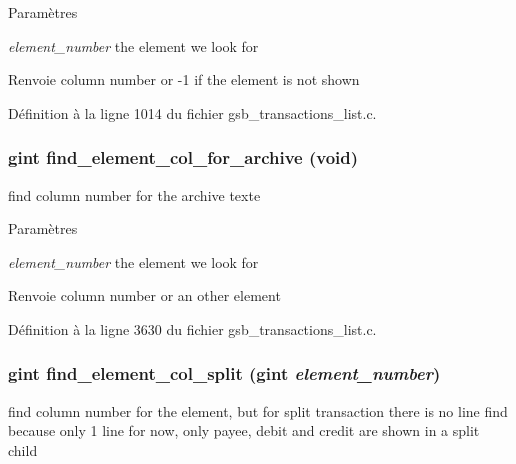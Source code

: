 \begin{DoxyParams}{Paramètres}
\item[{\em element\_\-number}]the element we look for\end{DoxyParams}
\begin{DoxyReturn}{Renvoie}
column number or -\/1 if the element is not shown 
\end{DoxyReturn}


Définition à la ligne 1014 du fichier gsb\_\-transactions\_\-list.c.

\subsubsection[{find\_\-element\_\-col\_\-for\_\-archive}]{\setlength{\rightskip}{0pt plus 5cm}gint find\_\-element\_\-col\_\-for\_\-archive (void)}\label{gsb__transactions__list_8h_aa2d81179288c9dd410d36fc58c9a9ca4}
find column number for the archive texte


\begin{DoxyParams}{Paramètres}
\item[{\em element\_\-number}]the element we look for\end{DoxyParams}
\begin{DoxyReturn}{Renvoie}
column number or an other element 
\end{DoxyReturn}


Définition à la ligne 3630 du fichier gsb\_\-transactions\_\-list.c.

\subsubsection[{find\_\-element\_\-col\_\-split}]{\setlength{\rightskip}{0pt plus 5cm}gint find\_\-element\_\-col\_\-split (gint {\em element\_\-number})}\label{gsb__transactions__list_8h_aa33a589932f8d657a321fd0bb5a4447f}
find column number for the element, but for split transaction there is no line find because only 1 line for now, only payee, debit and credit are shown in a split child


